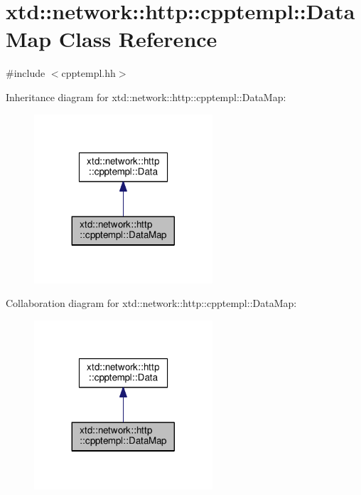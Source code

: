 \hypertarget{classxtd_1_1network_1_1http_1_1cpptempl_1_1DataMap}{}\section{xtd\+:\+:network\+:\+:http\+:\+:cpptempl\+:\+:Data\+Map Class Reference}
\label{classxtd_1_1network_1_1http_1_1cpptempl_1_1DataMap}


{\ttfamily \#include $<$cpptempl.\+hh$>$}



Inheritance diagram for xtd\+:\+:network\+:\+:http\+:\+:cpptempl\+:\+:Data\+Map\+:
\nopagebreak
\begin{figure}[H]
\begin{center}
\leavevmode
\includegraphics[width=188pt]{classxtd_1_1network_1_1http_1_1cpptempl_1_1DataMap__inherit__graph}
\end{center}
\end{figure}


Collaboration diagram for xtd\+:\+:network\+:\+:http\+:\+:cpptempl\+:\+:Data\+Map\+:
\nopagebreak
\begin{figure}[H]
\begin{center}
\leavevmode
\includegraphics[width=188pt]{classxtd_1_1network_1_1http_1_1cpptempl_1_1DataMap__coll__graph}
\end{center}
\end{figure}
